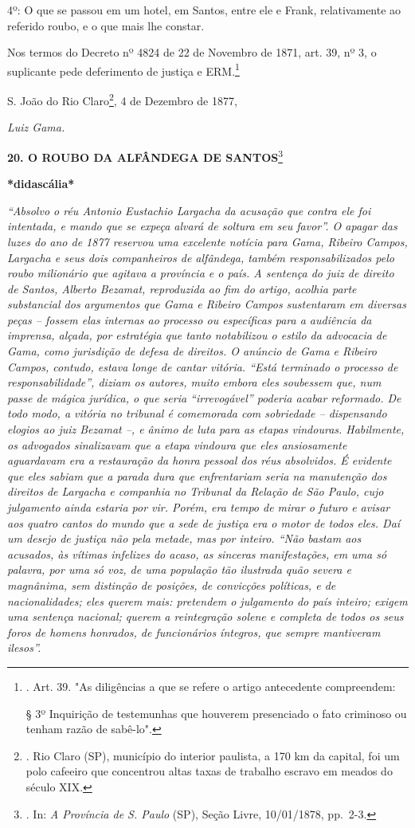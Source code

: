 4º: O que se passou em um hotel, em Santos, entre ele e Frank,
relativamente ao referido roubo, e o que mais lhe constar.

Nos termos do Decreto nº 4824 de 22 de Novembro de 1871, art. 39, nº 3,
o suplicante pede deferimento de justiça e ERM.\footnote{. Art. 39. "As
  diligências a que se refere o artigo antecedente compreendem:

  § 3º Inquirição de testemunhas que houverem presenciado o fato
  criminoso ou tenham razão de sabê-lo".}

S. João do Rio Claro\footnote{. Rio Claro (SP), município do interior
  paulista, a 170 km da capital, foi um polo cafeeiro que concentrou
  altas taxas de trabalho escravo em meados do século XIX.}, 4 de
Dezembro de 1877,

\emph{Luiz Gama.}

\textbf{20. O ROUBO DA ALFÂNDEGA DE SANTOS}\footnote{. In: \emph{A
  Província de S. Paulo} (SP), Seção Livre, 10/01/1878, pp.~2-3.}

\textbf{*didascália*}

\emph{``Absolvo o réu Antonio Eustachio Largacha da acusação que contra
ele foi intentada, e mando que se expeça alvará de soltura em seu
favor''. O apagar das luzes do ano de 1877 reservou uma excelente
notícia para Gama, Ribeiro Campos, Largacha e seus dois companheiros de
alfândega, também responsabilizados pelo roubo milionário que agitava a
província e o país. A sentença do juiz de direito de Santos, Alberto
Bezamat, reproduzida ao fim do artigo, acolhia parte substancial dos
argumentos que Gama e Ribeiro Campos sustentaram em diversas peças --
fossem elas internas ao processo ou específicas para a audiência da
imprensa, alçada, por estratégia que tanto notabilizou o estilo da
advocacia de Gama, como jurisdição de defesa de direitos. O anúncio de
Gama e Ribeiro Campos, contudo, estava longe de cantar vitória. ``Está
terminado o processo de responsabilidade'', diziam os autores, muito
embora eles soubessem que, num passe de mágica jurídica, o que seria
``irrevogável'' poderia acabar reformado. De todo modo, a vitória no
tribunal é comemorada com sobriedade -- dispensando elogios ao juiz
Bezamat --, e ânimo de luta para as etapas vindouras. Habilmente, os
advogados sinalizavam que a etapa vindoura que eles ansiosamente
aguardavam era a restauração da honra pessoal dos réus absolvidos. É
evidente que eles sabiam que a parada dura que enfrentariam seria na
manutenção dos direitos de Largacha e companhia no Tribunal da Relação
de São Paulo, cujo julgamento ainda estaria por vir. Porém, era tempo de
mirar o futuro e avisar aos quatro cantos do mundo que a sede de justiça
era o motor de todos eles. Daí um desejo de justiça não pela metade, mas
por inteiro. ``Não bastam aos acusados, às vítimas infelizes do acaso,
as sinceras manifestações, em uma só palavra, por uma só voz, de uma
população tão ilustrada quão severa e magnânima, sem distinção de
posições, de convicções políticas, e de nacionalidades; eles querem
mais: pretendem o julgamento do país inteiro; exigem uma sentença
nacional; querem a reintegração solene e completa de todos os seus foros
de homens honrados, de funcionários íntegros, que sempre mantiveram
ilesos''. }

